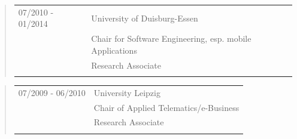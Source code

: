 	\begin{quote}
		\begin{tabular}{p{4cm}l}
			07/2010 - 01/2014&University of Duisburg-Essen\\
			&Chair for Software Engineering, esp. mobile Applications\\
			&Research Associate\\\\
		\end{tabular}
	\end{quote}
	\begin{quote}
		\begin{tabular}{p{4cm}l}
			07/2009 - 06/2010&University Leipzig\\
			&Chair of Applied Telematics/e-Business\\   
			&Research Associate\\\\
			\end{tabular}
		\end{quote}
